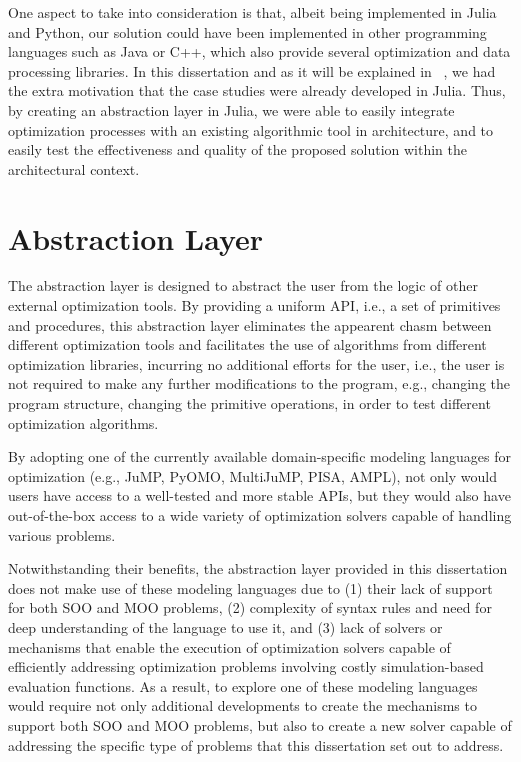 
One aspect to take into consideration is that, albeit being implemented in Julia and Python, our solution could have been implemented in other programming languages such as Java or C++, which also provide several optimization and data processing libraries. In this dissertation and as it will be explained in ~, we had the extra motivation that the case studies were already developed in Julia. Thus, by creating an abstraction layer in Julia, we were able to easily integrate optimization processes with an existing algorithmic tool in architecture, and to easily test the effectiveness and quality of the proposed solution within the architectural context. 

\section{Abstraction Layer}
The abstraction layer is designed to abstract the user from the logic of other external optimization tools. By providing a uniform \ac{API}, i.e., a set of primitives and procedures, this abstraction layer eliminates the appearent chasm between different optimization tools and facilitates the use of algorithms from different optimization libraries, incurring no additional efforts for the user, i.e., the user is not required to make any further modifications to the program, e.g., changing the program structure, changing the primitive operations, in order to test different optimization algorithms. 

By adopting one of the currently available domain-specific modeling languages for optimization (e.g., JuMP, PyOMO, MultiJuMP, PISA, AMPL), not only would users have access to a well-tested and more stable \acp{API}, but they would also have out-of-the-box access to a wide variety of optimization solvers capable of handling various problems. 

Notwithstanding their benefits, the abstraction layer provided in this dissertation does not make use of these modeling languages due to (1) their lack of support for both \ac{SOO} and \ac{MOO} problems, (2) complexity of syntax rules and need for deep understanding of the language to use it, and (3) lack of solvers or mechanisms that enable the execution of optimization solvers capable of efficiently addressing optimization problems involving costly simulation-based evaluation functions. As a result, to explore one of these modeling languages would require not only additional developments to create the mechanisms to support both \ac{SOO} and \ac{MOO} problems, but also to create a new solver capable of addressing the specific type of problems that this dissertation set out to address. 

